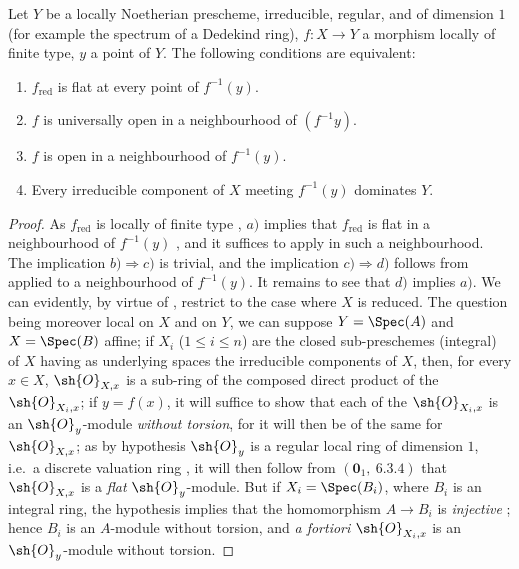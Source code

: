 \begin{proposition}[14.3.8]
\label{IV.14.3.8}
Let $Y$ be a locally Noetherian prescheme, irreducible, regular, and of dimension $1$ (for example the spectrum of a Dedekind ring), $f:X\to Y$ a morphism locally of finite type, $y$ a point of $Y$.
The following conditions are equivalent:
\begin{enumerate}[label=\emph{\alph*)}]
  \item $f_{\mathrm{red}}$ is flat at every point of $f^{-1}(y)$.
  \item $f$ is universally open in a neighbourhood of $(f^{-1}y)$.
  \item $f$ is open in a neighbourhood of $f^{-1}(y)$.
  \item Every irreducible component of $X$ meeting $f^{-1}(y)$ dominates $Y$.
\end{enumerate}
\end{proposition}

\begin{proof}
As $f_{\mathrm{red}}$ is locally of finite type , $a)$ implies that $f_{\mathrm{red}}$ is flat in a neighbourhood of $f^{-1}(y)$ , and it suffices to apply  in such a neighbourhood.
The implication $b)\Rightarrow c)$ is trivial, and the implication $c)\Rightarrow d)$ follows from  applied to a neighbourhood of $f^{-1}(y)$.
It remains to see that $d)$ implies $a)$.
We can evidently, by virtue of , restrict to the case where $X$ is reduced.
The question being moreover local on $X$ and on $Y$, we can suppose $Y=\Spec(A)$ and $X=\Spec(B)$
affine; if $X_i$ ($1\leq i\leq n$) are the closed sub-preschemes (integral) of $X$ having as underlying spaces the irreducible components of $X$, then, for every $x\in X$, $\sh{O}_{X,x}$ is a sub-ring of the composed direct product of the $\sh{O}_{X_i,x}$; if $y=f(x)$, it will suffice to show that each of the $\sh{O}_{X_i,x}$ is an $\sh{O}_y$-module \emph{without torsion}, for it will then be of the same for $\sh{O}_{X,x}$; as by hypothesis $\sh{O}_y$ is a regular local ring of dimension $1$, i.e.\ a discrete valuation ring , it will then follow from $(\mathbf{0}_1,~6.3.4)$ that $\sh{O}_{X,x}$ is a \emph{flat} $\sh{O}_y$-module.
But if $X_i=\Spec(B_i)$, where $B_i$ is an integral ring, the hypothesis implies that the homomorphism $A\to B_i$ is \emph{injective} ; hence $B_i$ is an $A$-module without torsion, and \emph{a fortiori} $\sh{O}_{X_i,x}$ is an $\sh{O}_y$-module without torsion.
\end{proof}

